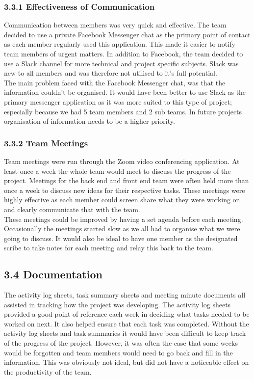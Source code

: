 \documentclass[11pt]{article}
\begin{document}
\begin{adjustwidth}{1cm}{}

\subsubsection{3.3.1 Effectiveness of Communication}
Communication between members was very quick and effective. The team decided to use a private Facebook Messenger chat as the primary point of contact as each member regularly used this application. This made it easier to notify team members of urgent matters. In addition to Facebook, the team decided to use a Slack channel for more technical and project specific subjects. Slack was new to all members and was therefore not utilised to it's full potential. \\

The main problem faced with the Facebook Messenger chat, was that the information couldn't be organised. It would have been better to use Slack as the primary messenger application as it was more suited to this type of project; especially because we had 5 team members and 2 sub teams. In future projects organisation of information needs to be a higher priority.

\subsubsection{3.3.2 Team Meetings}
Team meetings were run through the Zoom video conferencing application. At least once a week the whole team would meet to discuss the progress of the project. Meetings for the back end and front end team were often held more than once a week to discuss new ideas for their respective tasks. These meetings were highly effective as each member could screen share what they were working on and clearly communicate that with the team. \\

These meetings could be improved by having a set agenda before each meeting. Occasionally the meetings started slow as we all had to organise what we were going to discuss. It would also be ideal to have one member as the designated scribe to take notes for each meeting and relay this back to the team.

\end{adjustwidth}

\subsection{3.4 Documentation}
The activity log sheets, task summary sheets and meeting minute documents all assisted in tracking how the project was developing. The activity log sheets provided a good point of reference each week in deciding what tasks needed to be worked on next. It also helped ensure that each task was completed. Without the activity log sheets and task summaries it would have been difficult to keep track of the progress of the project. However, it was often the case that some weeks would be forgotten and team members would need to go back and fill in the information. This was obviously not ideal, but did not have a noticeable effect on the productivity of the team. \\
\end{document}
